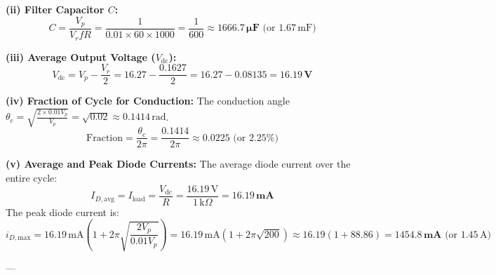 \documentclass[12pt,a3paper]{article}
\begin{document}
\begin{enumerate}
\begin{tcolorbox}[enhanced,breakable,ansbox,colback=cA!4,colframe=cA,boxrule=0.8pt,arc=5pt,title={\textbf{Answer}},fonttitle=\bfseries\color{white},colbacktitle=cA]
\textbf{(ii) Filter Capacitor $C$:}
\begin{equation}
    C = \frac{V_p}{V_r f R} = \frac{1}{0.01 \times 60 \times 1000} = \frac{1}{600} \approx \mathbf{1666.7\,\mu\text{F}} \text{ (or } 1.67\,\text{mF)}
\end{equation}

\textbf{(iii) Average Output Voltage ($V_{\text{dc}}$):}
\begin{equation}
    V_{\text{dc}} = V_p - \frac{V_r}{2} = 16.27 - \frac{0.1627}{2} = 16.27 - 0.08135 = \mathbf{16.19\,\text{V}}
\end{equation}

\textbf{(iv) Fraction of Cycle for Conduction:}
The conduction angle $\theta_c = \sqrt{\frac{2 \times 0.01 V_p}{V_p}} = \sqrt{0.02} \approx 0.1414\,\text{rad}$.
\begin{equation}
    \text{Fraction} = \frac{\theta_c}{2\pi} = \frac{0.1414}{2\pi} \approx \mathbf{0.0225} \text{ (or } 2.25\%)
\end{equation}

\textbf{(v) Average and Peak Diode Currents:}
The average diode current over the entire cycle:
\begin{equation}
    I_{D,\text{avg}} = I_{\text{load}} = \frac{V_{\text{dc}}}{R} = \frac{16.19\,\text{V}}{1\,\text{k}\Omega} = \mathbf{16.19\,\text{mA}}
\end{equation}
The peak diode current is:
\begin{equation}
    i_{D,\text{max}} = 16.19\,\text{mA} \left( 1 + 2\pi \sqrt{\frac{2 V_p}{0.01 V_p}} \right) = 16.19\,\text{mA} \left( 1 + 2\pi \sqrt{200} \right) \approx 16.19 (1 + 88.86) = \mathbf{1454.8\,\text{mA}} \text{ (or } 1.45\,\text{A)}
\end{equation}

---


\end{tcolorbox}
\end{enumerate}
\end{document}
